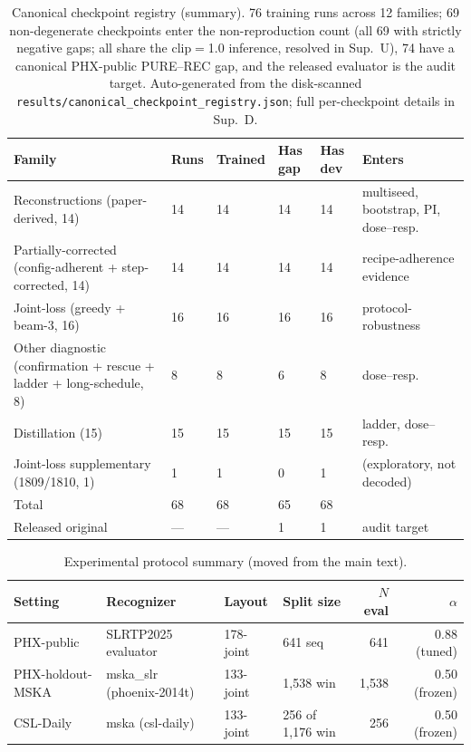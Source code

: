 \documentclass[pdflatex,sn-chicago]{sn-jnl}
\begin{document}
\begin{table}[h]
\centering
\scriptsize\setlength{\tabcolsep}{3pt}
\caption{Canonical checkpoint registry (summary). 76 training runs across 12 families; 69 non-degenerate checkpoints enter the non-reproduction count (all 69 with strictly negative gaps; all share the clip$=$1.0 inference, resolved in Sup.~U), 74 have a canonical PHX-public PURE--REC gap, and the released evaluator is the audit target. Auto-generated from the disk-scanned \texttt{results/canonical\_checkpoint\_registry.json}; full per-checkpoint details in Sup.~D.}
\label{tab:s6_checkpoint_registry_summary}
\begin{tabular}{p{4.2cm}p{1.0cm}p{1.5cm}p{1.4cm}p{1.4cm}p{3.0cm}}
\toprule
Family & Runs & Trained & Has gap & Has dev & Enters \\
\midrule
Reconstructions (paper-derived, 14) & 14 & 14 & 14 & 14 & multiseed, bootstrap, PI, dose--resp. \\
Partially-corrected (config-adherent + step-corrected, 14) & 14 & 14 & 14 & 14 & recipe-adherence evidence \\
Joint-loss (greedy + beam-3, 16) & 16 & 16 & 16 & 16 & protocol-robustness \\
Other diagnostic (confirmation + rescue + ladder + long-schedule, 8) & 8 & 8 & 6 & 8 & dose--resp. \\
Distillation (15) & 15 & 15 & 15 & 15 & ladder, dose--resp. \\
Joint-loss supplementary (1809/1810, 1) & 1 & 1 & 0 & 1 & (exploratory, not decoded) \\
\midrule
Total & 68 & 68 & 65 & 68 & \\
Released original & --- & --- & 1 & 1 & audit target \\
\bottomrule
\end{tabular}
\end{table}

\begin{table}[h]
\centering
\scriptsize
\caption{Experimental protocol summary (moved from the main text).}
\label{tab:s7_protocol_summary}
\begin{tabular}{llllrr}
\toprule
Setting & Recognizer & Layout & Split size & $N$ eval & $\alpha$ \\
\midrule
PHX-public  & SLRTP2025 evaluator       & 178-joint & 641 seq      & 641    & 0.88 (tuned) \\
PHX-holdout-MSKA & mska\_slr (phoenix-2014t) & 133-joint & 1{,}538 win  & 1{,}538 & 0.50 (frozen) \\
CSL-Daily   & mska (csl-daily)           & 133-joint & 256 of 1,176 win & 256    & 0.50 (frozen) \\
\bottomrule
\end{tabular}
\end{table}
\end{document}
